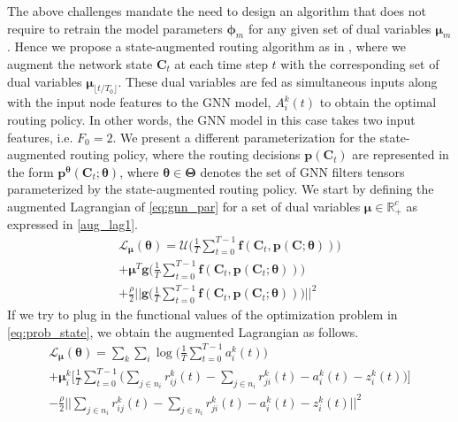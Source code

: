 \documentclass[lettersize,journal]{IEEEtran}
\begin{document}
The above challenges mandate the need to design an algorithm that does not require to retrain the model parameters $\bm{\phi}_m$ for any given set of dual variables $\bm{\mu}_m$. Hence we propose a state-augmented routing algorithm as in \cite{calvo2021state, naderializadeh2022state}, where we augment the network state $\mathbf{C}_t$ at each time step $t$ with the corresponding set of dual variables $\bm{\mu}_{\lfloor t/T_0 \rfloor}$. These dual variables are fed as simultaneous inputs along with the input node features to the GNN model, $A_i^k(t)$ to obtain the optimal routing policy. In other words, the GNN model in this case takes two input features, i.e. $F_0=2$. We present a different parameterization for the state-augmented routing policy, where the routing decisions $\mathbf{p}(\mathbf{C}_t)$ are represented in the form $\mathbf{p}^{\bm{\theta}} (\mathbf{C}_t; \bm{\theta})$, where $\bm{\theta} \in \bm{\Theta}$ denotes the set of GNN filters tensors parameterized by the state-augmented routing policy. We start by defining the augmented Lagrangian of \eqref{eq:gnn_par} for a set of dual variables $\bm{\mu} \in \mathbb{R}_+^c$ as expressed in  \eqref{aug_lag1}. %
\begin{multline} \label{eq:aug_lag2}
    \mathcal{L}_{\bm{\mu}}(\bm{\theta}) = \mathcal{U} \Biggl(\frac{1}{T} \sum_{t=0}^{T-1} \mathbf{f}(\mathbf{C}_t, \mathbf{p}(\mathbf{C};\bm{\theta}))\Biggl) \\
    + \bm{\mu}^T  \mathbf{g}\Biggl(\frac{1}{T} \sum_{t=0}^{T-1} \mathbf{f}(\mathbf{C}_t, \mathbf{p}(\mathbf{C}_t;\bm{\theta})) \Biggl) \\
    + \frac{\rho}{2} \Biggl|\!\Biggl| \mathbf{g}\Biggl(\frac{1}{T} \sum_{t=0}^{T-1} \mathbf{f}(\mathbf{C}_t, \mathbf{p}(\mathbf{C}_t;\bm{\theta})) \Biggl) \Biggr|\!\Biggr|^2
\end{multline}
If we try to plug in the functional values of the optimization problem in \eqref{eq:prob_state}, we obtain the augmented Lagrangian as follows.
\begin{multline} \label{eq:lagrangian_applied}
    \mathcal{L}_{\bm{\mu}} (\bm{\theta}) = \sum_k \sum_i \log \Biggl(\frac{1}{T} \sum_{t=0}^{T-1} a_i^k(t) \Biggl) \\
    + \bm{\mu}_i^k \Bigg[ \frac{1}{T} \sum_{t=0}^{T-1} \Bigg( \sum_{j \in n_i} r_{ij}^k(t) - \sum_{j \in n_i} r_{ji}^k(t) - a_i^k(t) - z_i^k(t) \bigg)\Bigg] \\
    - \frac{\rho}{2} \Biggl|\!\Biggl| \sum_{j \in n_i} r_{ij}^k(t) - \sum_{j \in n_i} r_{ji}^k(t) - a_i^k(t) - z_i^k(t) \Biggr|\!\Biggr|^2
\end{multline}
\end{document}

